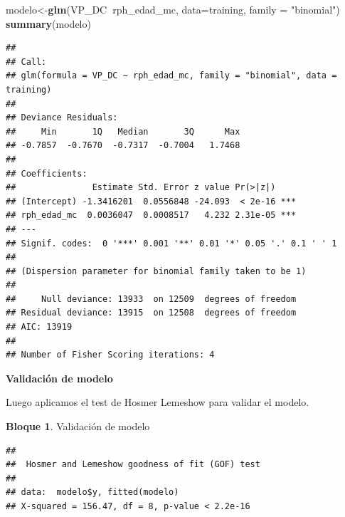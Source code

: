 \documentclass[]{book}
\newenvironment{Shaded}{\begin{snugshade}}{\end{snugshade}}
\newcommand{\CommentTok}[1]{\textcolor[rgb]{0.56,0.35,0.01}{\textit{#1}}}
\newcommand{\DataTypeTok}[1]{\textcolor[rgb]{0.13,0.29,0.53}{#1}}
\newcommand{\DecValTok}[1]{\textcolor[rgb]{0.00,0.00,0.81}{#1}}
\newcommand{\KeywordTok}[1]{\textcolor[rgb]{0.13,0.29,0.53}{\textbf{#1}}}
\newcommand{\NormalTok}[1]{#1}
\newcommand{\OperatorTok}[1]{\textcolor[rgb]{0.81,0.36,0.00}{\textbf{#1}}}
\newcommand{\StringTok}[1]{\textcolor[rgb]{0.31,0.60,0.02}{#1}}
\theoremstyle{definition}
\theoremstyle{definition}
\newtheorem{example}{Bloque}[chapter]
\theoremstyle{definition}
\theoremstyle{definition}
\theoremstyle{remark}
\begin{document}
\begin{Shaded}
\begin{Highlighting}[]
\NormalTok{modelo<-}\KeywordTok{glm}\NormalTok{(VP_DC}\OperatorTok{~}\NormalTok{rph_edad_mc, }
            \DataTypeTok{data=}\NormalTok{training, }
            \DataTypeTok{family =} \StringTok{"binomial"}\NormalTok{)}
\KeywordTok{summary}\NormalTok{(modelo)}
\end{Highlighting}
\end{Shaded}

\begin{verbatim}
## 
## Call:
## glm(formula = VP_DC ~ rph_edad_mc, family = "binomial", data = training)
## 
## Deviance Residuals: 
##     Min       1Q   Median       3Q      Max  
## -0.7857  -0.7670  -0.7317  -0.7004   1.7468  
## 
## Coefficients:
##               Estimate Std. Error z value Pr(>|z|)    
## (Intercept) -1.3416201  0.0556848 -24.093  < 2e-16 ***
## rph_edad_mc  0.0036047  0.0008517   4.232 2.31e-05 ***
## ---
## Signif. codes:  0 '***' 0.001 '**' 0.01 '*' 0.05 '.' 0.1 ' ' 1
## 
## (Dispersion parameter for binomial family taken to be 1)
## 
##     Null deviance: 13933  on 12509  degrees of freedom
## Residual deviance: 13915  on 12508  degrees of freedom
## AIC: 13919
## 
## Number of Fisher Scoring iterations: 4
\end{verbatim}

\textbf{Validación de modelo}

Luego aplicamos el test de Hosmer Lemeshow para validar el modelo.

\begin{example}
\protect\hypertarget{exm:bloque83nbm}{}{\label{exm:bloque83nbm} }Validación de modelo
\end{example}

\begin{Shaded}
\end{Shaded}

\begin{verbatim}
## 
##  Hosmer and Lemeshow goodness of fit (GOF) test
## 
## data:  modelo$y, fitted(modelo)
## X-squared = 156.47, df = 8, p-value < 2.2e-16
\end{verbatim}
\end{document}

